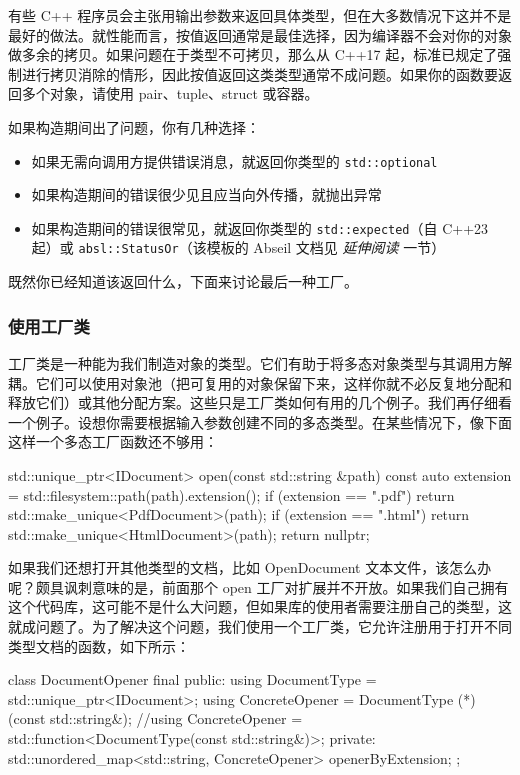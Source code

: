 有些 C++ 程序员会主张用输出参数来返回具体类型，但在大多数情况下这并不是最好的做法。就性能而言，按值返回通常是最佳选择，因为编译器不会对你的对象做多余的拷贝。如果问题在于类型不可拷贝，那么从 C++17 起，标准已规定了强制进行拷贝消除的情形，因此按值返回这类类型通常不成问题。如果你的函数要返回多个对象，请使用 pair、tuple、struct 或容器。

如果构造期间出了问题，你有几种选择：

\begin{itemize}
\item 如果无需向调用方提供错误消息，就返回你类型的 \texttt{std::\allowbreak{}optional}
\item 如果构造期间的错误很少见且应当向外传播，就抛出异常
\label{idx:576}
\item 如果构造期间的错误很常见，就返回你类型的 \texttt{std::\allowbreak{}expected}（自 C++23 起）或 \texttt{absl::\allowbreak{}Status\allowbreak{}Or}（该模板的 Abseil 文档见 \emph{延伸阅读} 一节）
\end{itemize}

既然你已经知道该返回什么，下面来讨论最后一种工厂。

\subsubsection{使用工厂类}

\label{idx:577}
工厂类是一种能为我们制造对象的类型。它们有助于将多态对象类型与其调用方解耦。它们可以使用对象池（把可复用的对象保留下来，这样你就不必反复地分配和释放它们）或其他分配方案。这些只是工厂类如何有用的几个例子。我们再仔细看一个例子。设想你需要根据输入参数创建不同的多态类型。在某些情况下，像下面这样一个多态工厂函数还不够用：

\begin{codebox}[cpp]
std::unique_ptr<IDocument> open(const std::string &path) {
    const auto extension = std::filesystem::path(path).extension();
    if (extension == ".pdf") return std::make_unique<PdfDocument>(path);
    if (extension == ".html") return std::make_unique<HtmlDocument>(path);
    return nullptr;
}
\end{codebox}

\label{idx:578}
如果我们还想打开其他类型的文档，比如 OpenDocument 文本文件，该怎么办呢？颇具讽刺意味的是，前面那个 open 工厂对扩展并不开放。如果我们自己拥有这个代码库，这可能不是什么大问题，但如果库的使用者需要注册自己的类型，这就成问题了。为了解决这个问题，我们使用一个工厂类，它允许注册用于打开不同类型文档的函数，如下所示：

\begin{codebox}[cpp]
class DocumentOpener final {
public:
    using DocumentType = std::unique_ptr<IDocument>;
    using ConcreteOpener = DocumentType (*)(const std::string&);
    //using ConcreteOpener = std::function<DocumentType(const std::string&)>;
private:
    std::unordered_map<std::string, ConcreteOpener> openerByExtension;
};
\end{codebox}

